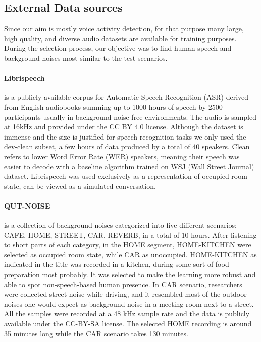 \subsection{External Data sources}

Since our aim is mostly voice activity detection, for that purpose many large, high quality, and diverse audio datasets are available for training purposes. During the selection process, our objective was to find human speech and background noises most similar to the test scenarios.

\paragraph*{Librispeech}\cite{librispch} is a publicly available corpus for Automatic Speech Recognition (ASR) derived from English audiobooks summing up to 1000 hours of speech by 2500 participants usually in background noise free environments. The audio is sampled at 16kHz and provided under the CC BY 4.0 license. Although the dataset is immense and the size is justified for speech recognition tasks we only used the dev-clean subset, a few hours of data produced by a total of 40 speakers. Clean refers to lower Word Error Rate (WER) speakers, meaning their speech was easier to decode with a baseline algorithm trained on WSJ (Wall Street Journal) dataset. Librispeech was used exclusively as a representation of occupied room state, can be viewed as a simulated conversation.

\paragraph*{QUT-NOISE} \cite{qut_noise} is a collection of background noises categorized into five different scenarios; CAFE, HOME, STREET, CAR, REVERB, in a total of 10 hours. After listening to short parts of each category, in the HOME segment, HOME-KITCHEN were selected as occupied room state, while CAR as unoccupied. HOME-KITCHEN as indicated in the title was recorded in a kitchen, during some sort of food preparation most probably. It was selected to make the learning more robust and able to spot non-speech-based human presence. In CAR scenario, researchers were collected street noise while driving, and it resembled most of the outdoor noises one would expect as background noise in a meeting room next to a street. All the samples were recorded at a 48 kHz sample rate and the data is publicly available under the CC-BY-SA license. The selected HOME recording is around 35 minutes long while the CAR scenario takes 130 minutes.


